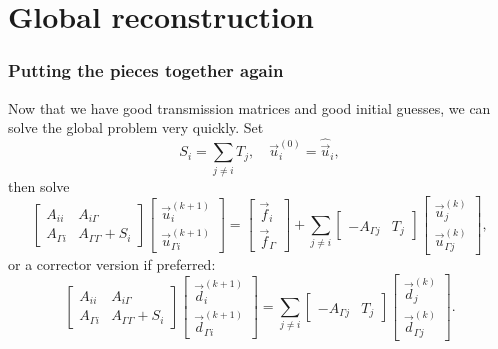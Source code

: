 \documentclass{beamer}
\begin{document}
\section{Global reconstruction}

\begin{frame}
\frametitle{Putting the pieces together again}

Now that we have good transmission matrices and good initial guesses, we can solve the global problem very quickly.
Set
\begin{equation*}
	S_i = \sum_{j \neq i} T_j, \quad \vec{u}_i^{(0)} = \hat{\vec{u}}_i,
\end{equation*}
then solve
\begin{equation*}
	\begin{bmatrix}
		A_{ii} & A_{i \Gamma} \\
		A_{\Gamma i} & A_{\Gamma \Gamma} + S_i
	\end{bmatrix}
	\begin{bmatrix} \vec{u}_i^{(k+1)} \\ \vec{u}_{\Gamma i}^{(k+1)} \end{bmatrix}
	=
	\begin{bmatrix} \vec{f}_i \\ \vec{f}_\Gamma \end{bmatrix}
	+ \sum_{j \neq i}
	\begin{bmatrix} ~ \\ -A_{\Gamma j} & T_j \end{bmatrix}
	\begin{bmatrix} \vec{u}_j^{(k)} \\ \vec{u}_{\Gamma j}^{(k)} \end{bmatrix},
\end{equation*}
or a corrector version if preferred:
\begin{equation*}
	\begin{bmatrix}
		A_{ii} & A_{i \Gamma} \\
		A_{\Gamma i} & A_{\Gamma \Gamma} + S_i
	\end{bmatrix}
	\begin{bmatrix} \vec{d}_i^{(k+1)} \\ \vec{d}_{\Gamma i}^{(k+1)} \end{bmatrix}
	= \sum_{j \neq i}
	\begin{bmatrix} ~ \\ -A_{\Gamma j} & T_j \end{bmatrix}
	\begin{bmatrix} \vec{d}_j^{(k)} \\ \vec{d}_{\Gamma j}^{(k)} \end{bmatrix}.
\end{equation*}
\end{frame}
\end{document}
